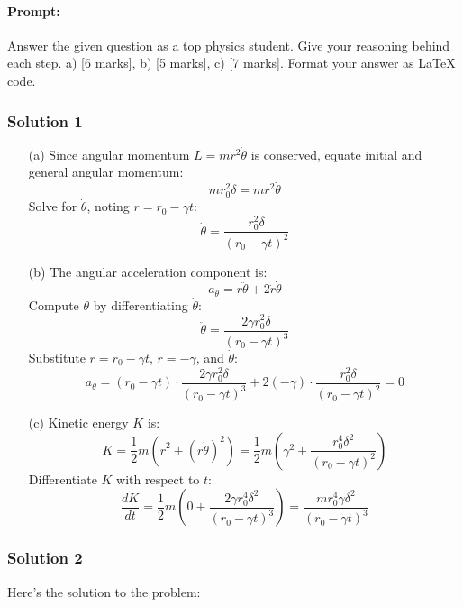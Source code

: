 \documentclass{article}
\begin{document}
\paragraph{Prompt: \\} 
Answer the given question as a top physics student. Give your reasoning behind each step. a) [6 marks], b) [5 marks], c) [7 marks].
Format your answer as LaTeX code.

\subsubsection{Solution 1}
\begin{itemize}
    \item[(a)] Since angular momentum \( L = m r^2 \dot{\theta} \) is conserved, equate initial and general angular momentum:
    \[
    m r_0^2 \delta = m r^2 \dot{\theta}
    \]
    Solve for \( \dot{\theta} \), noting \( r = r_0 - \gamma t \):
    \[
    \dot{\theta} = \frac{r_0^2 \delta}{(r_0 - \gamma t)^2}
    \]

    \item[(b)] The angular acceleration component is:
    \[
    a_\theta = r \ddot{\theta} + 2 \dot{r} \dot{\theta}
    \]
    Compute \( \ddot{\theta} \) by differentiating \( \dot{\theta} \):
    \[
    \ddot{\theta} = \frac{2 \gamma r_0^2 \delta}{(r_0 - \gamma t)^3}
    \]
    Substitute \( r = r_0 - \gamma t \), \( \dot{r} = -\gamma \), and \( \dot{\theta} \):
    \[
    a_\theta = (r_0 - \gamma t) \cdot \frac{2 \gamma r_0^2 \delta}{(r_0 - \gamma t)^3} + 2(-\gamma) \cdot \frac{r_0^2 \delta}{(r_0 - \gamma t)^2} = 0
    \]

    \item[(c)] Kinetic energy \( K \) is:
    \[
    K = \frac{1}{2} m \left( \dot{r}^2 + (r \dot{\theta})^2 \right) = \frac{1}{2} m \left( \gamma^2 + \frac{r_0^4 \delta^2}{(r_0 - \gamma t)^2} \right)
    \]
    Differentiate \( K \) with respect to \( t \):
    \[
    \frac{dK}{dt} = \frac{1}{2} m \left( 0 + \frac{2 \gamma r_0^4 \delta^2}{(r_0 - \gamma t)^3} \right) = \frac{m r_0^4 \gamma \delta^2}{(r_0 - \gamma t)^3}
    \]
\end{itemize}

\subsubsection{Solution 2}
Here's the solution to the problem:
\end{document}
